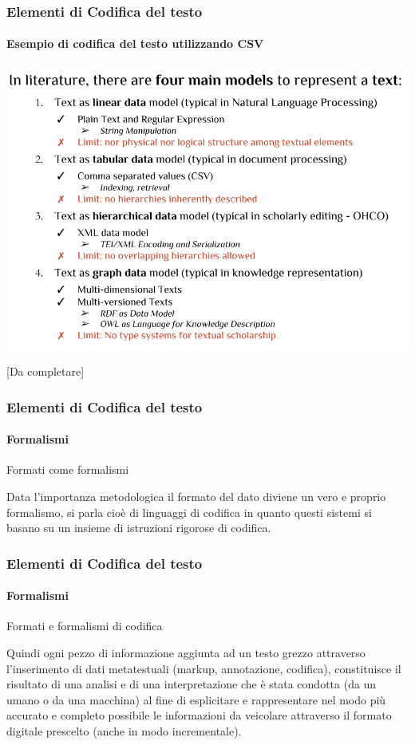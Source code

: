 \begin{frame}
	\frametitle{Elementi di Codifica del testo}
	\framesubtitle{Esempio di codifica del testo utilizzando CSV}
	\addtocounter{nframe}{1}

	
		\begin{center}
			\includegraphics[width=.9\textwidth]{imgs/dataModels-slide.png}
		\end{center}
	[Da completare]
	
\end{frame}



\begin{frame}
	\frametitle{Elementi di Codifica del testo}
	\framesubtitle{Formalismi}
	\addtocounter{nframe}{1}

	\begin{block}{Formati come formalismi}
		\begin{center}
			Data l'importanza metodologica il formato del dato diviene un vero e proprio formalismo, si parla cioè di linguaggi di codifica in quanto questi sistemi si basano su un insieme di istruzioni rigorose di codifica.
		\end{center}

	\end{block}

\end{frame}



\begin{frame}
	\frametitle{Elementi di Codifica del testo}
	\framesubtitle{Formalismi}
	\addtocounter{nframe}{1}

	\begin{block}{Formati e formalismi di codifica}

		Quindi ogni pezzo di informazione aggiunta ad un testo grezzo attraverso l'inserimento di dati metatestuali (markup, annotazione, codifica), constituisce il risultato di una analisi e di una interpretazione che è stata condotta (da un umano o da una macchina) al fine di esplicitare e rappresentare nel modo più accurato e completo possibile le informazioni da veicolare attraverso il formato digitale prescelto (anche in modo incrementale).


	\end{block}

\end{frame}





